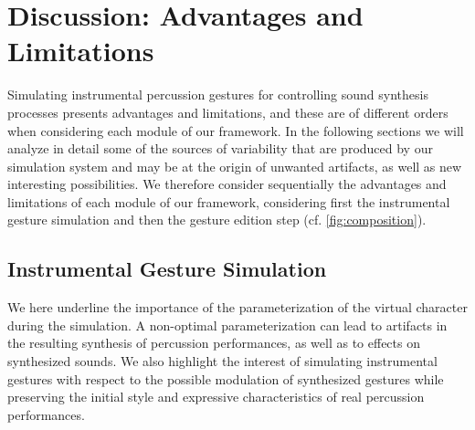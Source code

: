 


		
	\section{Discussion: Advantages and Limitations}
	\label{sec:Music_AL}

Simulating instrumental percussion gestures for controlling sound synthesis processes presents advantages and limitations, and these are of different orders when considering each module of our framework. In the following sections we will analyze in detail some of the sources of variability that are produced by our simulation system and may be at the origin of unwanted artifacts, as well as new interesting possibilities. We therefore consider sequentially the advantages and limitations of each module of our framework, considering first the instrumental gesture simulation and then the gesture edition step (cf. \myfigname \ref{fig:composition}).


		\subsection{Instrumental Gesture Simulation}
		\label{subsec:Music_AL_IGS}

We here underline the importance of the parameterization of the virtual character during the simulation. A non-optimal parameterization can lead to artifacts in the resulting synthesis of percussion performances, as well as to effects on synthesized sounds. We also highlight the interest of simulating instrumental gestures with respect to the possible modulation of synthesized gestures while preserving the initial style and expressive characteristics of real percussion performances.


